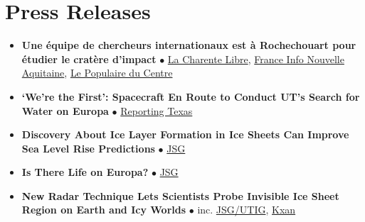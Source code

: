 \section*{Press Releases}

\begin{itemize}[leftmargin=3.8em, labelsep=1.5em]
    \setlength\itemsep{-.5em}

    \item[\texttt{2025}] \textbf{Une équipe de chercheurs internationaux est à Rochechouart pour étudier le cratère d’impact} $\bullet$ \href{https://www.charentelibre.fr/lieux/charente/c-est-excitant-de-comprendre-ce-qu-il-pourrait-se-passer-en-cas-de-collision-une-equipe-de-chercheurs-internationaux-est-a-rochechouart-pour-etudier-le-cratere-d-impact-24832924.php}{La Charente Libre}, \href{https://france3-regions.franceinfo.fr/nouvelle-aquitaine/haute-vienne/limoges/de-quoi-est-fait-le-sol-de-mars-ou-de-la-lune-ces-chercheurs-americains-enquetent-grace-a-la-meteorite-de-rochechouart-3170040.html}{France Info Nouvelle Aquitaine}, \href{https://www.lepopulaire.fr/rochechouart-87600/actualites/des-scientifiques-americains-menent-des-etudes-sur-le-site-de-la-meteorite-a-rochechouart_14703072/}{Le Populaire du Centre}

    \item[\texttt{2024}] \textbf{‘We’re the First’: Spacecraft En Route to Conduct UT’s Search for Water on Europa} $\bullet$ \href{https://www.reportingtexas.com/were-the-first-spacecraft-en-route-to-conduct-uts-search-for-water-on-europa/}{Reporting Texas}

    \item[\texttt{2024}] \textbf{Discovery About Ice Layer Formation in Ice Sheets Can Improve Sea Level Rise Predictions} $\bullet$ \href{https://www.jsg.utexas.edu/news/2024/09/new-discovery-about-ice-layer-formation-in-ice-sheets-can-improve-sea-level-rise-predictions/}{JSG}

    \item[\texttt{2023}] \textbf{Is There Life on Europa?} $\bullet$ \href{https://www.jsg.utexas.edu/news/2023/12/is-there-life-on-europa/}{JSG}
    
    \item[\texttt{2023}] \textbf{New Radar Technique Lets Scientists Probe Invisible Ice Sheet Region on Earth and Icy Worlds} $\bullet$ inc. \href{https://ig.utexas.edu/news/2023/new-radar-technique-lets-scientists-probe-invisible-ice-sheet-region-on-earth-and-icy-worlds/}{JSG/UTIG}, \href{https://www.kxan.com/news/science/texas-students-work-travels-to-jupiter-helps-track-climate-change-on-earth/}{Kxan}
    

\end{itemize}
